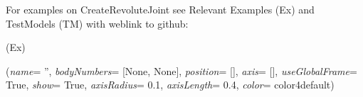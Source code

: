 %
\noindent For examples on CreateRevoluteJoint see Relevant Examples (Ex) and TestModels (TM) with weblink to github:
\bi
 \item \footnotesize {} (Ex)
\ei

%
\begin{flushleft}
\label{sec:mainsystemextensions:CreatePrismaticJoint}
({\it name}= '', {\it bodyNumbers}= [None, None], {\it position}= [], {\it axis}= [], {\it useGlobalFrame}= True, {\it show}= True, {\it axisRadius}= 0.1, {\it axisLength}= 0.4, {\it color}= color4default)
\end{flushleft}
\setlength{\itemindent}{0.7cm}
